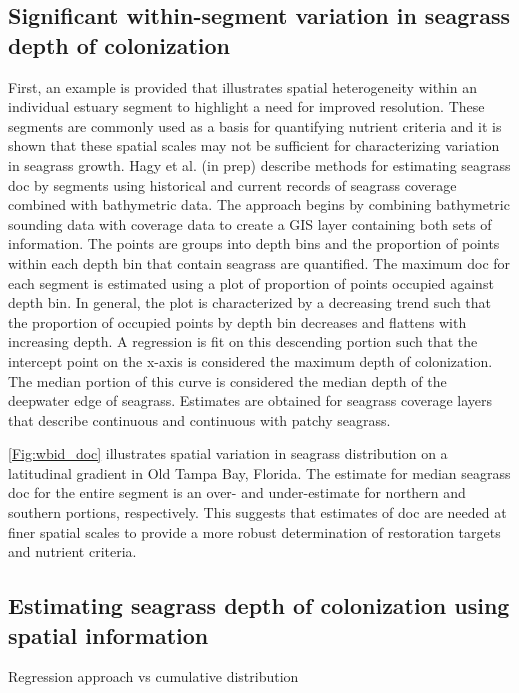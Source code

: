 \documentclass[letterpaper,12pt]{article}\usepackage[]{graphicx}\usepackage[]{color}
\begin{document}
\subsection{Significant within-segment variation in seagrass depth of colonization}

First, an example is provided that illustrates spatial heterogeneity within an individual estuary segment to highlight a need for improved resolution.  These segments are commonly used as a basis for quantifying nutrient criteria and it is shown that these spatial scales  may not be sufficient for characterizing variation in seagrass growth. Hagy et al. (in prep) describe methods for estimating seagrass \ac{doc} by segments using historical and current records of seagrass coverage combined with bathymetric data.  The approach begins by combining bathymetric sounding data with coverage data to create a \ac{GIS} layer containing both sets of information.  The points are groups into depth bins and the proportion of points within each depth bin that contain seagrass are quantified.  The maximum \ac{doc} for each segment is estimated using a plot of proportion of points occupied against depth bin.  In general, the plot is characterized by a decreasing trend such that the proportion of occupied points by depth bin decreases and flattens with increasing depth.  A regression is fit on this descending portion such that the intercept point on the x-axis is considered the maximum depth of colonization.  The median portion of this curve is considered the median depth of the deepwater edge of seagrass.  Estimates are obtained for seagrass coverage layers that describe continuous and continuous with patchy seagrass.  

\cref{Fig:wbid_doc} illustrates spatial variation in seagrass distribution on a latitudinal gradient in Old Tampa Bay, Florida.  The estimate for median seagrass \ac{doc} for the entire segment is an over- and under-estimate for northern and southern portions, respectively.  This suggests that estimates of \ac{doc} are needed at finer spatial scales to provide a more robust determination of restoration targets and nutrient criteria. 

\subsection{Estimating seagrass depth of colonization using spatial information}

Regression approach vs cumulative distribution
\end{document}
